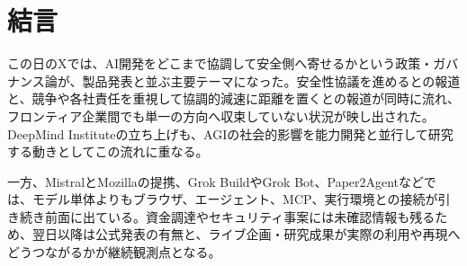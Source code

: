 \section*{結言}
この日のXでは、AI開発をどこまで協調して安全側へ寄せるかという政策・ガバナンス論が、製品発表と並ぶ主要テーマになった。安全性協議を進めるとの報道と、競争や各社責任を重視して協調的減速に距離を置くとの報道が同時に流れ、フロンティア企業間でも単一の方向へ収束していない状況が映し出された。DeepMind Instituteの立ち上げも、AGIの社会的影響を能力開発と並行して研究する動きとしてこの流れに重なる。

一方、MistralとMozillaの提携、Grok BuildやGrok Bot、Paper2Agentなどでは、モデル単体よりもブラウザ、エージェント、MCP、実行環境との接続が引き続き前面に出ている。資金調達やセキュリティ事案には未確認情報も残るため、翌日以降は公式発表の有無と、ライブ企画・研究成果が実際の利用や再現へどうつながるかが継続観測点となる。
